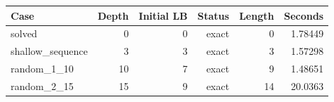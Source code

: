 {\small
\begin{tabular}{lrrrrr}
\hline
Case & Depth & Initial LB & Status & Length & Seconds \\
\hline
solved & 0 & 0 & exact & 0 & 1.78449 \\
shallow\_sequence & 3 & 3 & exact & 3 & 1.57298 \\
random\_1\_10 & 10 & 7 & exact & 9 & 1.48651 \\
random\_2\_15 & 15 & 9 & exact & 14 & 20.0363 \\
\hline
\end{tabular}
}
